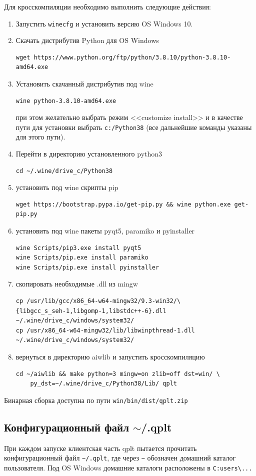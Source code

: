 \documentclass[12pt]{article}
\begin{document}
Для кросскомпиляции необходимо выполнить следующие действия:
\begin{enumerate}
\item Запустить \verb'winecfg' и установить версию OS Windows 10.
\item Скачать дистрибутив Python для OS Windows
\begin{verbatim}
wget https://www.python.org/ftp/python/3.8.10/python-3.8.10-amd64.exe
\end{verbatim}
\item Установить скачанный дистрибутив под wine
\begin{verbatim}
wine python-3.8.10-amd64.exe
\end{verbatim}
  при этом желательно выбрать режим <<customize install>> и в качестве пути для установки выбрать \verb'c:/Python38' (все дальнейшие команды указаны для этого пути).
\item Перейти в директорию установленного python3
\begin{verbatim}
cd ~/.wine/drive_c/Python38
\end{verbatim}
\item установить под wine скрипты pip
\begin{verbatim}
wget https://bootstrap.pypa.io/get-pip.py && wine python.exe get-pip.py
\end{verbatim}
\item установить под wine пакеты pyqt5, paramiko и pyinstaller
\begin{verbatim}
wine Scripts/pip3.exe install pyqt5
wine Scripts/pip.exe install paramiko
wine Scripts/pip.exe install pyinstaller
\end{verbatim}
\item скопировать необходимые .dll из mingw
\begin{verbatim}
cp /usr/lib/gcc/x86_64-w64-mingw32/9.3-win32/\
{libgcc_s_seh-1,libgomp-1,libstdc++-6}.dll ~/.wine/drive_c/windows/system32/
cp /usr/x86_64-w64-mingw32/lib/libwinpthread-1.dll ~/.wine/drive_c/windows/system32/
\end{verbatim}
\item вернуться в директорию aiwlib  и запустить кросскомпиляцию
\begin{verbatim}
cd ~/aiwlib && make python=3 mingw=on zlib=off dst=win/ \
    py_dst=~/.wine/drive_c/Python38/Lib/ qplt
\end{verbatim}
\end{enumerate}
Бинарная сборка доступна по пути \verb'win/bin/dist/qplt.zip'

\subsection{Конфигурационный файл $\sim$/.qplt}
При каждом  запуске клиентская часть qplt пытается прочитать конфигурационный файл \verb'~/.qplt', где через \verb'~' обозначен домашний каталог пользователя.
Под OS Windows домашние каталоги расположены в \verb'C:users\...'
\end{document}
